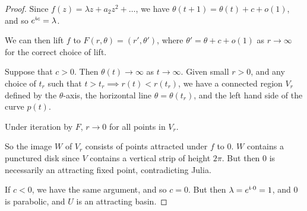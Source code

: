 \documentclass[10pt,a4paper]{article}
\begin{document}
\begin{proof}
  Since $f(z) =\lambda z+ a_2z^2+\ldots$, we have $\theta(t+1) = \theta(t)+c+o(1)$, and so $e^{\mathfrak{i} c} = \lambda$.

  We can then lift $f$ to $F(r, \theta) = (r', \theta')$, where $\theta' = \theta+c+o(1)$ as $r \to \infty$ for the correct choice of lift.

  Suppose that $c>0$. Then $\theta(t) \to \infty$ as $t \to \infty$. Given small $r > 0$, and any choice of $t_r$ such that $t > t_r \implies r(t) < r(t_r)$, we have a connected region $V_r$ defined by the $\theta$-axis, the horizontal line $\theta=\theta(t_r)$, and the left hand side of the curve $p(t)$.

  Under iteration by $F$, $r \to 0$ for all points in $V_r$.

  So the image $W$ of $V_r$ consists of points attracted under $f$ to $0$. $W$ contains a punctured disk since $V$ contains a vertical strip of height $2\pi$. But then $0$ is necessarily an attracting fixed point, contradicting Julia.

  If $c<0$, we have the same argument, and so $c=0$. But then $\lambda = e^{\mathfrak{i} \cdot 0} = 1$, and $0$ is parabolic, and $U$ is an attracting basin.
\end{proof}
\end{document}

